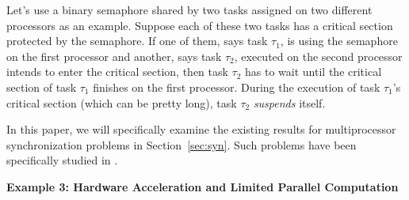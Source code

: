 Let's use a binary semaphore shared by two tasks assigned on two different processors as an example. Suppose each of these two tasks has a critical section protected by the semaphore. If one of them, says task $\tau_1$, is using the semaphore on the first processor and another, says task $\tau_2$, executed on the second processor intends to enter the critical section, then task $\tau_2$ has to wait until the critical section of task $\tau_1$ finishes on the first processor. During the execution of task $\tau_1$'s critical section (which can be pretty long), task $\tau_2$ \emph{suspends} itself. 


In this paper, we will specifically examine the existing results for multiprocessor synchronization problems in Section~\ref{sec:syn}. Such problems have been specifically studied in \cite{rajkumar-1990,lakshmanan-2009,zeng-2011,bbb-2013,yang-2013,kim-2014,han-2014,carminati-2014,yang-2014}.

{\bf Example 3: Hardware Acceleration and Limited Parallel Computation}


